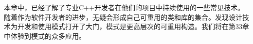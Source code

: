 本章中，已经了解了专业C++开发者在他们的项目中持续使用的一些常见技术。随着作为软件开发者的进步，无疑会形成自己可重用的类和库的集合。发现设计技术为开发和使用模式打开了大门，模式是更高层次的可重用构造。我们将在第33章中体验到模式的众多应用。